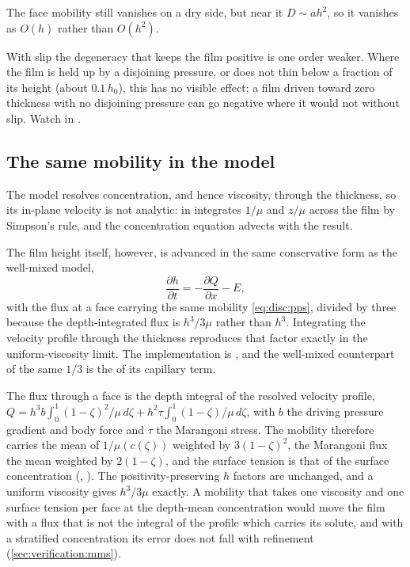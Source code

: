 The face mobility still vanishes on a dry side, but near it
$D \sim a h^{2}$, so it vanishes as $O(h)$ rather than $O(h^{2})$.

\begin{warn}
With slip the degeneracy that keeps the film positive is one order weaker.
Where the film is held up by a disjoining pressure, or does not thin below a
fraction of its height (about $0.1\,h_0$), this has no visible effect; a film
driven toward zero thickness with no disjoining pressure can go negative where
it would not without slip. Watch  in .
\end{warn}

\subsection{The same mobility in the \texorpdfstring{}{CZ} model}
\label{sec:disc:positivity-concz}

The  model resolves concentration, and hence viscosity, through the
thickness, so its in-plane velocity is not analytic:  in
 integrates $1/\mu$ and
$z/\mu$ across the film by Simpson's rule, and the concentration equation
advects with the result.

The film height itself, however, is advanced in the same conservative form as
the well-mixed model,
%
\begin{equation}
  \frac{\partial h}{\partial t} = -\frac{\partial Q}{\partial x} - E ,
  \label{eq:disc:cz-conservative}
\end{equation}
%
with the flux at a face carrying the same mobility \cref{eq:disc:pps}, divided
by three because the depth-integrated flux is $h^{3}/3\mu$ rather than $h^{3}$.
Integrating the  velocity profile through the thickness reproduces that
factor exactly in the uniform-viscosity limit. The implementation is
, and the well-mixed counterpart of the same $1/3$ is the
 of its capillary term.

\begin{note}
The flux through a face is the depth integral of the resolved velocity
profile,
$Q = h^3 b\int_0^1 (1-\zeta)^2/\mu\,d\zeta + h^2\tau\int_0^1 (1-\zeta)/\mu\,d\zeta$,
with $b$ the driving pressure gradient and body force and $\tau$ the
Marangoni stress. The mobility therefore carries the mean of $1/\mu(c(\zeta))$
weighted by $3(1-\zeta)^2$, the Marangoni flux the mean weighted by
$2(1-\zeta)$, and the surface tension is that of the surface concentration
(, ). The positivity-preserving
$h$ factors are unchanged, and a uniform viscosity gives $h^3/3\mu$ exactly.
A mobility that takes one viscosity and one surface tension per face at the
depth-mean concentration would move the film with a flux that is not the
integral of the profile which carries its solute, and with a stratified
concentration its error does not fall with refinement
(\cref{sec:verification:mms}).
\end{note}

